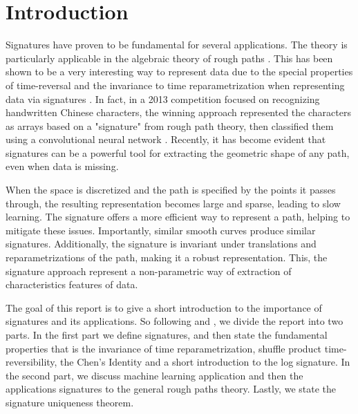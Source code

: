 \section{Introduction}\label{sec:introduction}


Signatures have proven to be fundamental for several applications. The theory is particularly applicable in the algebraic theory of rough paths \cite{geng2021introduction, geng2017reconstruction, fermanian2023new}. This has been shown to be a very interesting way to represent data due to the special properties of time-reversal and the invariance to time reparametrization when representing data via signatures \cite{chevyrev2016primer}. In fact, in a 2013 competition focused on recognizing handwritten Chinese characters, the winning approach represented the characters as arrays based on a "signature" from rough path theory, then classified them using a convolutional neural network \cite{yin2013icdar}. Recently, it has become evident that signatures can be a powerful tool for extracting the geometric shape of any path, even when data is missing.

When the space is discretized and the path is specified by the points it passes through, the resulting representation becomes large and sparse, leading to slow learning. The signature offers a more efficient way to represent a path, helping to mitigate these issues. Importantly, similar smooth curves produce similar signatures. Additionally, the signature is invariant under translations and reparametrizations of the path, making it a robust representation. This, the signature approach represent a non-parametric way of extraction of characteristics features of data.


The goal of this report is to give a short introduction to the importance of signatures and its applications. So following \cite{geng2021introduction} and \cite{chevyrev2016primer}, we divide the report into two parts. In the first part we define
signatures, and then state the fundamental properties that is the invariance of time reparametrization, shuffle product time-reversibility, the Chen's Identity and a short introduction to the log signature. In the second part, we discuss machine
learning application and then the applications signatures to the general rough paths theory. Lastly, we state the signature uniqueness theorem.
